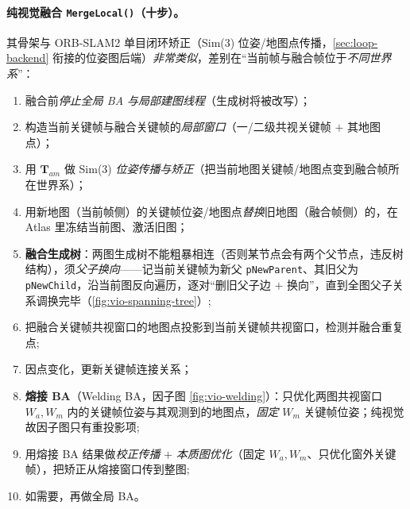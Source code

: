 \paragraph{纯视觉融合 \texttt{MergeLocal()}（十步）。}
其骨架与 ORB-SLAM2 单目闭环矫正（Sim(3) 位姿/地图点传播，\cref{sec:loop-backend} 衔接的位姿图后端）\emph{非常类似}，差别在“当前帧与融合帧位于\emph{不同世界系}”\cite{campos2021orbslam3}：
\begin{enumerate}
  \item 融合前\emph{停止全局 BA 与局部建图线程}（生成树将被改写）；
  \item 构造当前关键帧与融合关键帧的\emph{局部窗口}（一/二级共视关键帧 $+$ 其地图点）；
  \item 用 $\mathbf{T}_{am}$ 做 Sim(3) \emph{位姿传播与矫正}（把当前地图关键帧/地图点变到融合帧所在世界系）；
  \item 用新地图（当前帧侧）的关键帧位姿/地图点\emph{替换}旧地图（融合帧侧）的，在 Atlas 里冻结当前图、激活旧图；
  \item \textbf{融合生成树}：两图生成树不能粗暴相连（否则某节点会有两个父节点，违反树结构），须\emph{父子换向}——记当前关键帧为新父 \texttt{pNewParent}、其旧父为 \texttt{pNewChild}，沿当前图反向遍历，逐对“删旧父子边 $+$ 换向”，直到全图父子关系调换完毕（\cref{fig:vio-spanning-tree}）;
  \item 把融合关键帧共视窗口的地图点投影到当前关键帧共视窗口，检测并融合重复点;
  \item 因点变化，更新关键帧连接关系；
  \item \textbf{熔接 BA}（Welding BA，因子图 \cref{fig:vio-welding}）：只优化两图共视窗口 $W_a,W_m$ 内的关键帧位姿与其观测到的地图点，\emph{固定} $W_m$ 关键帧位姿；纯视觉故因子图只有重投影项;
  \item 用熔接 BA 结果做\emph{校正传播} $+$ \emph{本质图优化}（固定 $W_a,W_m$、只优化窗外关键帧），把矫正从熔接窗口传到整图;
  \item 如需要，再做全局 BA。
\end{enumerate}

